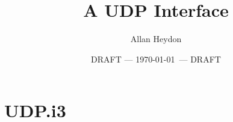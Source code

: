 \documentclass{article}
\begin{document}


\title{A UDP Interface}
\author{Allan Heydon}
\date{DRAFT --- \today\ --- DRAFT}
\maketitle

\section{UDP.i3}



\end{document}
